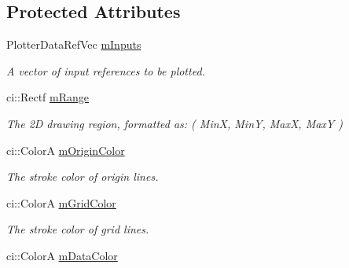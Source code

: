 \subsection*{Protected Attributes}
\begin{DoxyCompactItemize}
\item 
\hypertarget{class_ui_plot_a459756f5693d9c2a4386b8c9afeab6d7}{Plotter\-Data\-Ref\-Vec \hyperlink{class_ui_plot_a459756f5693d9c2a4386b8c9afeab6d7}{m\-Inputs}}\label{class_ui_plot_a459756f5693d9c2a4386b8c9afeab6d7}

\begin{DoxyCompactList}\small\item\em A vector of input references to be plotted. \end{DoxyCompactList}\item 
\hypertarget{class_ui_plot_a48c5655eb3818273e3db57c8b3922d40}{ci\-::\-Rectf \hyperlink{class_ui_plot_a48c5655eb3818273e3db57c8b3922d40}{m\-Range}}\label{class_ui_plot_a48c5655eb3818273e3db57c8b3922d40}

\begin{DoxyCompactList}\small\item\em The 2\-D drawing region, formatted as\-: ( Min\-X, Min\-Y, Max\-X, Max\-Y ) \end{DoxyCompactList}\item 
\hypertarget{class_ui_plot_acd67bf61b3df177184d7a3dbbceea79c}{ci\-::\-Color\-A \hyperlink{class_ui_plot_acd67bf61b3df177184d7a3dbbceea79c}{m\-Origin\-Color}}\label{class_ui_plot_acd67bf61b3df177184d7a3dbbceea79c}

\begin{DoxyCompactList}\small\item\em The stroke color of origin lines. \end{DoxyCompactList}\item 
\hypertarget{class_ui_plot_a6c9a695c8be63c39849ce2e3c0de92a8}{ci\-::\-Color\-A \hyperlink{class_ui_plot_a6c9a695c8be63c39849ce2e3c0de92a8}{m\-Grid\-Color}}\label{class_ui_plot_a6c9a695c8be63c39849ce2e3c0de92a8}

\begin{DoxyCompactList}\small\item\em The stroke color of grid lines. \end{DoxyCompactList}\item 
\hypertarget{class_ui_plot_a7eb91d0c14287a285febc8292f41650a}{ci\-::\-Color\-A \hyperlink{class_ui_plot_a7eb91d0c14287a285febc8292f41650a}{m\-Data\-Color}}\label{class_ui_plot_a7eb91d0c14287a285febc8292f41650a}


\end{DoxyCompactItemize}

